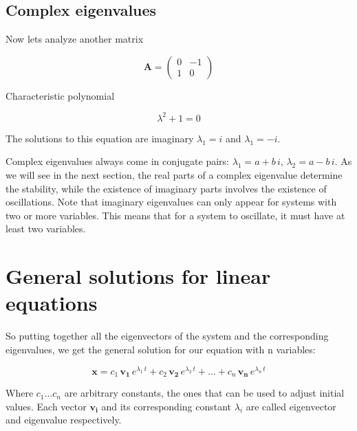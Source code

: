 \documentclass{tufte-book} %
\begin{document}
\subsection{Complex eigenvalues}

Now lets analyze another matrix 

\begin{equation}
	\mathbf{A}  = \begin{pmatrix} 0 & -1\\ 1 & 0\end{pmatrix}  \nonumber
\end{equation}

Characteristic polynomial

\begin{equation}
	\lambda^2 + 1 = 0 \nonumber
\end{equation}

The solutions to this equation are imaginary $\lambda_1 = i$ and $\lambda_1 = -i$.

Complex eigenvalues always come in conjugate pairs: $\lambda_1 = a + b\, i$,  $\lambda_2 = a - b\, i$. As we will see in the next section, the real parts of a complex eigenvalue determine the stability, while the existence of imaginary parts involves the existence of oscillations. Note that imaginary eigenvalues can only appear for systems with two or more variables. This means that for a system to oscillate, it must have at least two variables.


\section{General solutions for linear equations}

So putting together all the eigenvectors of the system and the corresponding eigenvalues, we get the general solution for our equation with n variables:


\begin{equation}
	\label{odenvar_mat_sol}
	\mathbf{x}= c_1 \, \mathbf{v_1} \, e^{\lambda_1 \, t} + c_2 \, \mathbf{v_2} \, e^{\lambda_2 \, t} +  \dots + c_n \, \mathbf{v_n} \, e^{\lambda_n \, t} 
\end{equation}

Where $c_1 \dots c_n$  are arbitrary constants, the ones that can be used to adjust initial values. Each vector $\mathbf{v_i}$ and its corresponding constant $\lambda_i$ are called eigenvector and eigenvalue respectively.
\end{document}
